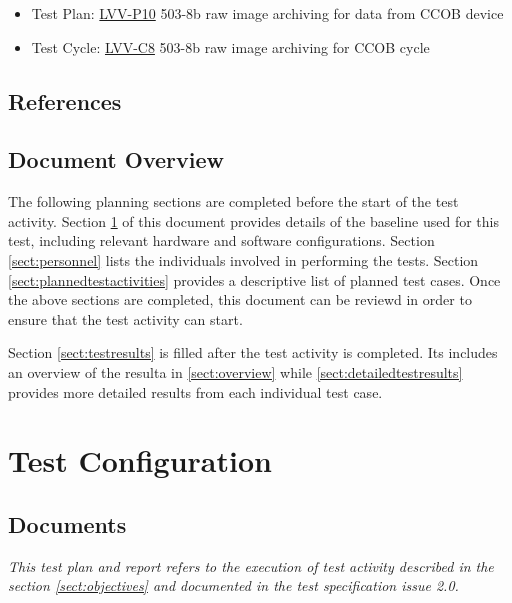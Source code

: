 \documentclass[DM,lsstdraft,STR,toc]{lsstdoc}
\begin{document}
\begin{itemize}
\item Test Plan: \href{https://jira.lsstcorp.org/secure/Tests.jspa\#/testPlan/LVV-P10}{LVV-P10} 503-8b raw image archiving for data from CCOB device 
\item Test Cycle: \href{https://jira.lsstcorp.org/secure/Tests.jspa\#/testCycle/LVV-C8}{LVV-C8} 503-8b raw image archiving for CCOB cycle
\end{itemize}

 
\subsection{References}
\label{sect:references}

\renewcommand{\refname}{}


\subsection{Document Overview}
\label{sect:docoverview}

The following planning sections are completed before the start of the test activity.
Section \ref{sect:configuration} of this document provides details of the \product{} baseline used for this test, including relevant hardware and software configurations.
Section \ref{sect:personnel} lists the individuals involved in performing the tests.
Section \ref{sect:plannedtestactivities} provides a descriptive list of planned test cases.
Once the above sections are completed, this document can be reviewd in order to ensure that the test activity can start.

Section \ref{sect:testresults} is filled after the test activity is completed. 
Its includes  an overview of the resulta in \ref{sect:overview}
while \ref{sect:detailedtestresults} provides more detailed results from each individual test case.

\section{Test Configuration}
\label{sect:configuration}

\subsection{Documents}

{\it
This test plan and report refers to the execution of test activity described in the section \ref{sect:objectives} and documented in the  test specification issue 2.0.
}
\end{document}

